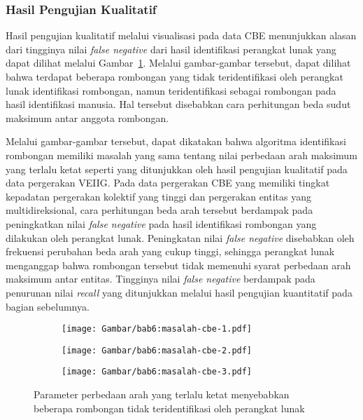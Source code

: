 \subsubsection{Hasil Pengujian Kualitatif}
\label{subsub:sec:cbe-qualitative}

Hasil pengujian kualitatif melalui visualisasi pada data CBE menunjukkan alasan dari tingginya nilai \textit{false negative} dari hasil identifikasi perangkat lunak yang dapat dilihat melalui Gambar~\ref{bab6:masalah-cbe}. Melalui gambar-gambar tersebut, dapat dilihat bahwa terdapat beberapa rombongan yang tidak teridentifikasi oleh perangkat lunak identifikasi rombongan, namun teridentifikasi sebagai rombongan pada hasil identifikasi manusia. Hal tersebut disebabkan cara perhitungan beda sudut maksimum antar anggota rombongan.

Melalui gambar-gambar tersebut, dapat dikatakan bahwa algoritma identifikasi rombongan memiliki masalah yang sama tentang nilai perbedaan arah maksimum yang terlalu ketat seperti yang ditunjukkan oleh hasil pengujian kualitatif pada data pergerakan VEIIG. Pada data pergerakan CBE yang memiliki tingkat kepadatan pergerakan kolektif yang tinggi dan pergerakan entitas yang multidireksional, cara perhitungan beda arah tersebut berdampak pada peningkatkan nilai \textit{false negative} pada hasil identifikasi rombongan yang dilakukan oleh perangkat lunak. Peningkatan nilai \textit{false negative} disebabkan oleh frekuensi perubahan beda arah yang cukup tinggi, sehingga perangkat lunak menganggap bahwa rombongan tersebut tidak memenuhi syarat perbedaan arah maksimum antar entitas. Tingginya nilai \textit{false negative} berdampak pada penurunan nilai \textit{recall} yang ditunjukkan melalui hasil pengujian kuantitatif pada bagian sebelumnya.

\begin{figure}[h]
    \centering
    \captionsetup{width=.75\textwidth}
    \begin{subfigure}[h]{0.275\textwidth}
        \centering
        \texttt{[image: Gambar/bab6:masalah-cbe-1.pdf]}
    \end{subfigure}
    \begin{subfigure}[h]{0.275\textwidth}
        \centering
        \texttt{[image: Gambar/bab6:masalah-cbe-2.pdf]}
    \end{subfigure}
    \begin{subfigure}[h]{0.275\textwidth}
        \centering
        \texttt{[image: Gambar/bab6:masalah-cbe-3.pdf]}
    \end{subfigure}
    \caption[Masalah syarat perbedaan arah maksimum pada data CBE]{Parameter perbedaan arah yang terlalu ketat menyebabkan beberapa rombongan tidak teridentifikasi oleh perangkat lunak}
    \label{bab6:masalah-cbe}
\end{figure}

